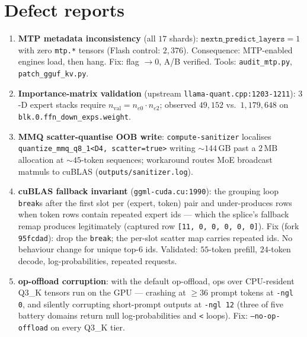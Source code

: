 \documentclass[11pt]{article}
\newcommand{\code}[1]{\texttt{#1}}
\newcommand{\gb}{\,\textrm{GB}}
\begin{document}
\section{Defect reports}
\label{app:defects}

\begin{enumerate}[leftmargin=1.6em]
  \item \textbf{MTP metadata inconsistency} (all $17$ shards):
    $\code{nextn\_predict\_layers}=1$ with zero \code{mtp.*} tensors (Flash
    control: $2{,}376$). Consequence: MTP-enabled engines load, then hang.
    Fix: flag $\to0$, A/B verified. Tools: \code{audit\_mtp.py},
    \code{patch\_gguf\_kv.py}.
  \item \textbf{Importance-matrix validation} (upstream
    \code{llama-quant.cpp:1203-1211}): $3$-D expert stacks require
    $n_{\text{val}}=n_{e0}\cdot n_{e2}$; observed $49{,}152$ vs.\ $1{,}179{,}648$
    on \code{blk.0.ffn\_down\_exps.weight}.
  \item \textbf{MMQ scatter-quantise OOB write}: \code{compute-sanitizer}
    localises \code{quantize\_mmq\_q8\_1<D4, scatter=true>} writing ${\sim}144\gb{}$
    past a $2\,\textrm{MB}$ allocation at ${\sim}45$-token sequences; workaround
    routes MoE broadcast matmuls to cuBLAS (\code{outputs/sanitizer.log}).
  \item \textbf{cuBLAS fallback invariant} (\code{ggml-cuda.cu:1990}): the
    grouping loop \code{break}s after the first slot per (expert, token) pair
    and under-produces rows when token rows contain repeated expert ids ---
    which the splice's fallback remap produces legitimately (captured row
    \code{[11, 0, 0, 0, 0, 0]}). Fix (fork \code{95fcdad}): drop the
    \code{break}; the per-slot scatter map carries repeated ids. No behaviour
    change for unique top-$6$ ids. Validated: $55$-token prefill,
    $24$-token decode, log-probabilities, repeated requests.
  \item \textbf{op-offload corruption}: with the default op-offload, ops over
    CPU-resident Q3\_K tensors run on the GPU --- crashing at $\ge36$ prompt
    tokens at \code{-ngl 0}, and silently corrupting short-prompt outputs at
    \code{-ngl 12} (three of five battery domains return null
    log-probabilities and \code{<} loops). Fix: \code{--no-op-offload} on every
    Q3\_K tier.
\end{enumerate}
\end{document}
